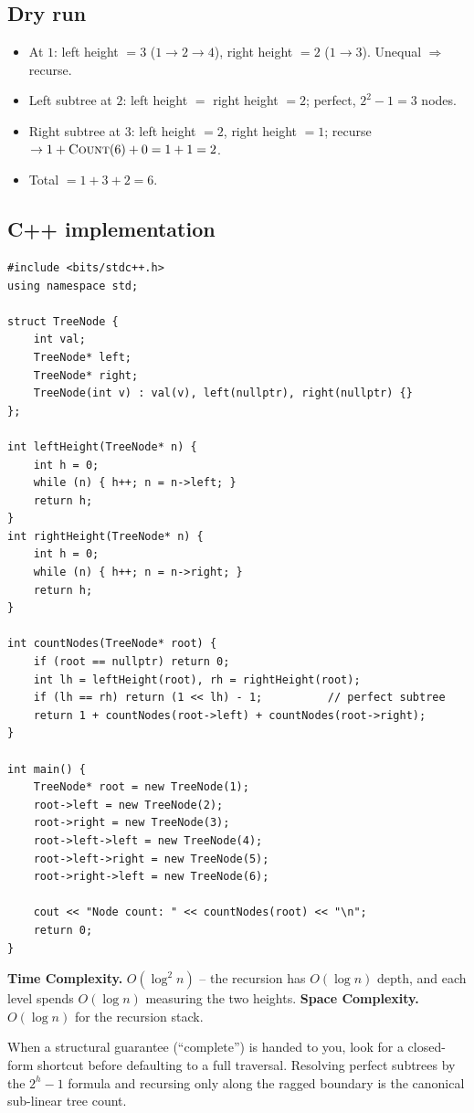 \subsection*{Dry run}


\begin{itemize}
  \item At $1$: left height $=3$ ($1\!\to\!2\!\to\!4$), right height $=2$
        ($1\!\to\!3$). Unequal $\Rightarrow$ recurse.
  \item Left subtree at $2$: left height $=$ right height $=2$; perfect,
        $2^2-1=3$ nodes.
  \item Right subtree at $3$: left height $=2$, right height $=1$; recurse
        $\to 1+\textsc{Count}(6)+0 = 1+1 = 2$.
  \item Total $=1+3+2=6$.
\end{itemize}

\subsection*{C++ implementation}

\begin{lstlisting}
#include <bits/stdc++.h>
using namespace std;

struct TreeNode {
    int val;
    TreeNode* left;
    TreeNode* right;
    TreeNode(int v) : val(v), left(nullptr), right(nullptr) {}
};

int leftHeight(TreeNode* n) {
    int h = 0;
    while (n) { h++; n = n->left; }
    return h;
}
int rightHeight(TreeNode* n) {
    int h = 0;
    while (n) { h++; n = n->right; }
    return h;
}

int countNodes(TreeNode* root) {
    if (root == nullptr) return 0;
    int lh = leftHeight(root), rh = rightHeight(root);
    if (lh == rh) return (1 << lh) - 1;          // perfect subtree
    return 1 + countNodes(root->left) + countNodes(root->right);
}

int main() {
    TreeNode* root = new TreeNode(1);
    root->left = new TreeNode(2);
    root->right = new TreeNode(3);
    root->left->left = new TreeNode(4);
    root->left->right = new TreeNode(5);
    root->right->left = new TreeNode(6);

    cout << "Node count: " << countNodes(root) << "\n";
    return 0;
}
\end{lstlisting}

\begin{complexitybox}
\textbf{Time Complexity.} $O(\log^2 n)$ -- the recursion has $O(\log n)$
depth, and each level spends $O(\log n)$ measuring the two heights.
\textbf{Space Complexity.} $O(\log n)$ for the recursion stack.
\end{complexitybox}

\begin{takeawaybox}
When a structural guarantee (``complete'') is handed to you, look for a
closed-form shortcut before defaulting to a full traversal. Resolving
perfect subtrees by the $2^h-1$ formula and recursing only along the ragged
boundary is the canonical sub-linear tree count.
\end{takeawaybox}
